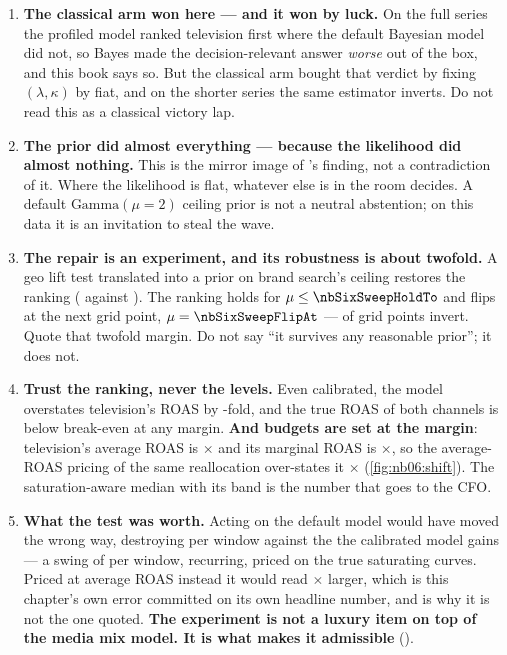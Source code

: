 \begin{enumerate}[leftmargin=*, itemsep=.45em]
  \item \textbf{The classical arm won here --- and it won by luck.} On the full series the profiled
        model ranked television first where the default Bayesian model did not, so Bayes made the
        decision-relevant answer \emph{worse} out of the box, and this book says so. But the
        classical arm bought that verdict by fixing $(\lambda, \kappa)$ by fiat, and on the shorter
        series the same estimator inverts. Do not read this as a classical victory lap.

  \item \textbf{The prior did almost everything --- because the likelihood did almost nothing.}
        This is the mirror image of 's finding, not a contradiction of it. Where the
        likelihood is flat, whatever else is in the room decides. A default
        $\text{Gamma}(\mu = 2)$ ceiling prior is not a neutral abstention; on this data it is an
        invitation to steal the wave.

  \item \textbf{The repair is an experiment, and its robustness is about twofold.} A geo lift test
        translated into a prior on brand search's ceiling restores the ranking
        (\eur{\nbSixCalTv} against \eur{\nbSixCalBs}). The ranking holds for
        $\mu \le \nbSixSweepHoldTo$ and flips at the next grid point, $\mu = \nbSixSweepFlipAt$ ---
        \nbSixSweepNFlipped{} of \nbSixSweepNGrid{} grid points invert. Quote that twofold margin.
        Do not say ``it survives any reasonable prior''; it does not.

  \item \textbf{Trust the ranking, never the levels.} Even calibrated, the model overstates
        television's ROAS by \nbSixCalRoasTvOverTrue-fold, and the true ROAS of both channels is
        below break-even at any margin. \textbf{And budgets are set at the margin}: television's
        average ROAS is \nbSixAvgRoasTv$\times$ and its marginal ROAS is \nbSixMargRoasTv$\times$,
        so the average-ROAS pricing of the same reallocation over-states it
        \nbSixAvgOverSat$\times$ (\cref{fig:nb06:shift}). The saturation-aware median with its band
        is the number that goes to the CFO.

  \item \textbf{What the test was worth.} Acting on the default model would have moved
        \eur{\nbSixMirrorShiftEur} the wrong way, destroying \eur{\nbSixMirrorDeltaSat} per window
        against the \eur{\nbSixTrueDeltaSat} the calibrated model gains --- a swing of
        \eur{\nbSixExperimentSwingSat} per window, recurring, priced on the true saturating curves.
        Priced at average ROAS instead it would read \nbSixSwingAvgOverSat$\times$ larger, which is
        this chapter's own error committed on its own headline number, and is why it is not the one
        quoted. \textbf{The experiment is not a luxury item on top of the media mix model. It is
        what makes it admissible} ().
\end{enumerate}

